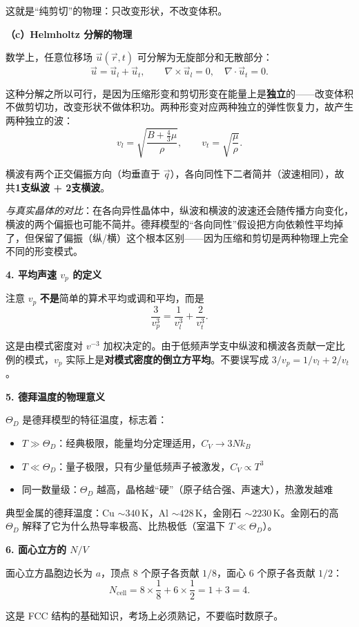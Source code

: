\begin{insightbox}[物理图像与概念深化]
这就是``纯剪切''的物理：只改变形状，不改变体积。

\textbf{（c）Helmholtz 分解的物理}

数学上，任意位移场 $\vec u(\vec r,t)$ 可分解为无旋部分和无散部分：
\begin{equation}
\vec u=\vec u_l+\vec u_t,\qquad \nabla\times\vec u_l=0,\quad \nabla\cdot\vec u_t=0.
\end{equation}

这种分解之所以可行，是因为压缩形变和剪切形变在能量上是\textbf{独立}的——改变体积不做剪切功，改变形状不做体积功。两种形变对应两种独立的弹性恢复力，故产生两种独立的波：
\begin{equation}
v_l=\sqrt{\frac{B+\frac{4}{3}\mu}{\rho}},\qquad v_t=\sqrt{\frac{\mu}{\rho}}.
\end{equation}

横波有两个正交偏振方向（均垂直于 $\vec q$），各向同性下二者简并（波速相同），故共\textbf{1支纵波 + 2支横波}。

\textit{与真实晶体的对比}：在各向异性晶体中，纵波和横波的波速还会随传播方向变化，横波的两个偏振也可能不简并。德拜模型的``各向同性''假设把方向依赖性平均掉了，但保留了偏振（纵/横）这个根本区别——因为压缩和剪切是两种物理上完全不同的形变模式。

\textbf{4. 平均声速 $v_p$ 的定义}

注意 $v_p$ \textbf{不是}简单的算术平均或调和平均，而是
\begin{equation}
\frac{3}{v_p^3}=\frac{1}{v_l^3}+\frac{2}{v_t^3}.
\end{equation}

这是由模式密度对 $v^{-3}$ 加权决定的。由于低频声学支中纵波和横波各贡献一定比例的模式，$v_p$ 实际上是\textbf{对模式密度的倒立方平均}。不要误写成 $3/v_p=1/v_l+2/v_t$。

\textbf{5. 德拜温度的物理意义}

$\Theta_D$ 是德拜模型的特征温度，标志着：
\begin{itemize}
    \item $T\gg\Theta_D$：经典极限，能量均分定理适用，$C_V\to3Nk_B$
    \item $T\ll\Theta_D$：量子极限，只有少量低频声子被激发，$C_V\propto T^3$
    \item 同一数量级：$\Theta_D$ 越高，晶格越``硬''（原子结合强、声速大），热激发越难
\end{itemize}

典型金属的德拜温度：Cu $\sim340\,\mathrm{K}$，Al $\sim428\,\mathrm{K}$，金刚石 $\sim2230\,\mathrm{K}$。金刚石的高 $\Theta_D$ 解释了它为什么热导率极高、比热极低（室温下 $T\ll\Theta_D$）。

\textbf{6. 面心立方的 $N/V$}

面心立方晶胞边长为 $a$，顶点 8 个原子各贡献 $1/8$，面心 6 个原子各贡献 $1/2$：
\begin{equation}
N_{\text{cell}}=8\times\frac{1}{8}+6\times\frac{1}{2}=1+3=4.
\end{equation}

这是 FCC 结构的基础知识，考场上必须熟记，不要临时数原子。
\end{insightbox}

